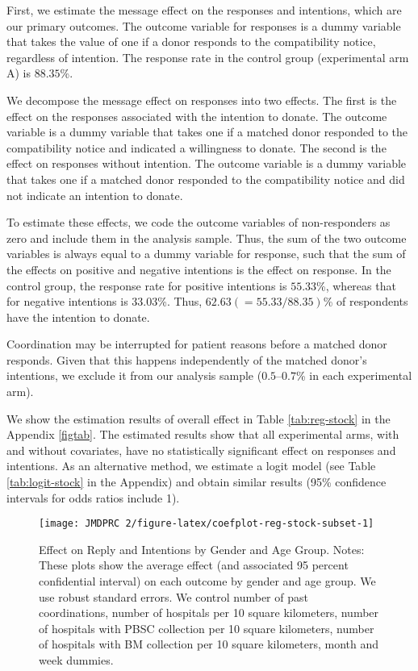 \documentclass[12pt, a4paper]{article}
\begin{document}
First, we estimate the message effect on the responses and intentions, which are our primary outcomes. The outcome variable for responses is a dummy variable that takes the value of one if a donor responds to the compatibility notice, regardless of intention. The response rate in the control group (experimental arm A) is \(88.35\)\%.

We decompose the message effect on responses into two effects. The first is the effect on the responses associated with the intention to donate. The outcome variable is a dummy variable that takes one if a matched donor responded to the compatibility notice and indicated a willingness to donate. The second is the effect on responses without intention. The outcome variable is a dummy variable that takes one if a matched donor responded to the compatibility notice and did not indicate an intention to donate.

To estimate these effects, we code the outcome variables of non-responders as zero and include them in the analysis sample. Thus, the sum of the two outcome variables is always equal to a dummy variable for response, such that the sum of the effects on positive and negative intentions is the effect on response. In the control group, the response rate for positive intentions is \(55.33\)\%, whereas that for negative intentions is \(33.03\)\%. Thus, \(62.63(=55.33/88.35)\)\% of respondents have the intention to donate.

Coordination may be interrupted for patient reasons before a matched donor responds. Given that this happens independently of the matched donor's intentions, we exclude it from our analysis sample (\(0.5\)--\(0.7\)\% in each experimental arm).

We show the estimation results of overall effect in Table \ref{tab:reg-stock} in the Appendix \ref{figtab}. The estimated results show that all experimental arms, with and without covariates, have no statistically significant effect on responses and intentions. As an alternative method, we estimate a logit model (see Table \ref{tab:logit-stock} in the Appendix) and obtain similar results (95\% confidence intervals for odds ratios include 1).

\begin{figure}[t]
\texttt{[image: JMDPRC~2/figure-latex/coefplot-reg-stock-subset-1]} \caption{Effect on Reply and Intentions by Gender and Age Group. Notes: These plots show the average effect (and associated 95 percent confidential interval) on each outcome by gender and age group. We use robust standard errors. We control number of past coordinations, number of hospitals per 10 square kilometers, number of hospitals with PBSC collection per 10 square kilometers, number of hospitals with BM collection per 10 square kilometers, month and week dummies.}\label{fig:coefplot-reg-stock-subset}
\end{figure}
\end{document}
